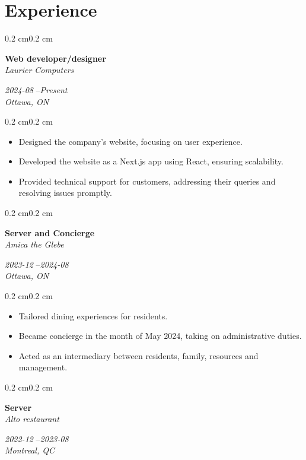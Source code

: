 \documentclass[10pt, letterpaper]{article}
\newenvironment{highlights}{%
    \begin{itemize}[
        topsep=0.10 cm,%
        parsep=0.10 cm,%
        partopsep=0pt,%
        itemsep=0pt,%
        leftmargin=0.4 cm + 10pt%
    ]
}{%
    \end{itemize}%
}
\newenvironment{onecolentry}{%
    \begin{adjustwidth}{0.2 cm}{0.2 cm}%
}{%
    \end{adjustwidth}%
}
\newenvironment{twocolentry}[1]{%
    \begin{onecolentry}%
    \def\twocolentryarg{#1}%
    \noindent
    \begin{minipage}[t]{0.68\textwidth} %
}{%
    \end{minipage}\hfill%
    \begin{minipage}[t]{0.30\textwidth} %
      \raggedleft\twocolentryarg
    \end{minipage}%
    \vspace{0.2cm}%
    \end{onecolentry}%
}
\begin{document}
\section{Experience}
\begin{twocolentry}{%
\textit{2024-08 }--\textit{Present} \\[0.1cm]
\textit{Ottawa, ON}%
}
    \textbf{Web developer/designer }\\
    \textit{Laurier Computers }
\end{twocolentry}
\vspace{0.10 cm}
\begin{onecolentry}
    \begin{highlights}
        \item Designed the company’s website, focusing on user experience.
        \item Developed the website as a Next.js app using React, ensuring scalability.
        \item Provided technical support for customers, addressing their queries and resolving issues promptly.
    \end{highlights}
\end{onecolentry}
\vspace{0.2 cm}
\begin{twocolentry}{%
\textit{2023-12 }--\textit{2024-08} \\[0.1cm]
\textit{Ottawa, ON}%
}
    \textbf{Server and Concierge }\\
    \textit{Amica the Glebe }
\end{twocolentry}
\vspace{0.10 cm}
\begin{onecolentry}
    \begin{highlights}
        \item Tailored dining experiences for residents.
        \item Became concierge in the month of May 2024, taking on administrative duties.
        \item Acted as an intermediary between residents, family, resources and management.
    \end{highlights}
\end{onecolentry}
\vspace{0.2 cm}
\begin{twocolentry}{%
\textit{2022-12 }--\textit{2023-08} \\[0.1cm]
\textit{Montreal, QC}%
}
    \textbf{Server }\\
    \textit{Alto restaurant }
\end{twocolentry}
\end{document}

